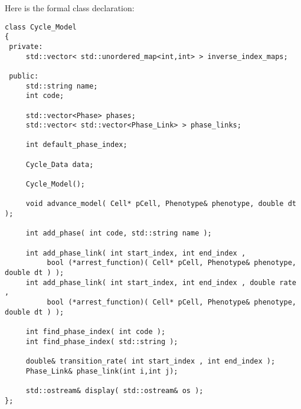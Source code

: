 \documentclass[12pt]{article}
\begin{document}
Here is the formal class declaration: 
\begin{verbatim}
class Cycle_Model
{
 private:
     std::vector< std::unordered_map<int,int> > inverse_index_maps; 
 
 public:
     std::string name; 
     int code; 

     std::vector<Phase> phases; 
     std::vector< std::vector<Phase_Link> > phase_links; 
     
     int default_phase_index; 
     
     Cycle_Data data; 

     Cycle_Model(); 
     
     void advance_model( Cell* pCell, Phenotype& phenotype, double dt ); 
     
     int add_phase( int code, std::string name ); 
     
     int add_phase_link( int start_index, int end_index , 
          bool (*arrest_function)( Cell* pCell, Phenotype& phenotype, double dt ) ); 
     int add_phase_link( int start_index, int end_index , double rate , 
          bool (*arrest_function)( Cell* pCell, Phenotype& phenotype, double dt ) ); 
            
     int find_phase_index( int code ); 
     int find_phase_index( std::string ); 
     
     double& transition_rate( int start_index , int end_index ); 
     Phase_Link& phase_link(int i,int j); 
     
     std::ostream& display( std::ostream& os ); 
};
\end{verbatim}
\end{document}
